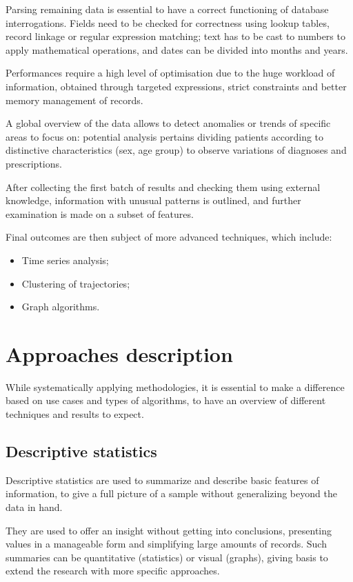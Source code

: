 Parsing remaining data is essential to have a correct functioning of database interrogations. Fields need to be checked for correctness using lookup tables, record linkage or regular expression matching; text has to be cast to numbers to apply mathematical operations, and dates can be divided into months and years.

Performances require a high level of optimisation due to the huge workload of information, obtained through targeted expressions, strict constraints and better memory management of records. 

A global overview of the data allows to detect anomalies or trends of specific areas to focus on: potential analysis pertains dividing patients according to distinctive characteristics (sex, age group) to observe variations of diagnoses and prescriptions. 

After collecting the first batch of results and checking them using external knowledge, information with unusual patterns is outlined, and further examination is made on a subset of features.

Final outcomes are then subject of more advanced techniques, which include:
\begin{itemize}
	\item Time series analysis;
	\item Clustering of trajectories;
	\item Graph algorithms.
\end{itemize}

\section{Approaches description}
While systematically applying methodologies, it is essential to make a difference based on use cases and types of algorithms, to have an overview of different techniques and results to expect.

\subsection{Descriptive statistics}
Descriptive statistics are used to summarize and describe basic features of information, to give a full picture of a sample without generalizing beyond the data in hand.

They are used to offer an insight without getting into conclusions, presenting values in a manageable form and simplifying large amounts of records. Such summaries can be quantitative (statistics) or visual (graphs), giving basis to extend the research with more specific approaches.


